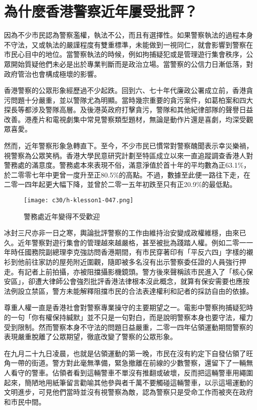 \section{為什麼香港警察近年屢受批評？}

因為不少市民認為警察濫權，執法不公，而且有選擇性。如果警察執法的過程本身不守法，又或執法的嚴謹程度有雙重標準，未能做到一視同仁，就會影響到警察在市民心目中的地位。當警察執法的時候，例如拘捕疑犯或是管理遊行集會秩序，公眾開始質疑他們未必是出於專業判斷而是政治立場。當警察的公信力日漸低落，對政府管治也會構成極壞的影響。

香港警察的公眾形象經歷過不少起跌。回到六、七十年代廉政公署成立前，香港貪污問題十分嚴重，並以警隊尤為明顯。當時幾宗重要的貪污案件，如葛柏案和四大探長等都涉及警隊高層。及後港英政府打擊貪污，警隊和其他紀律部隊的聲譽日益改善。港產片和電視劇集中常見警察類型題材，無論是動作片還是喜劇，均深受觀眾喜愛。

然而，近年警察形象急轉直下。至今，不少市民已慣常對警察醜聞表示幸災樂禍，視警察為公眾笑柄。香港大學民意研究計劃至特區成立以來一直追蹤調查香港人對警務處的滿意度。警務處本來表現不俗，滿意淨值於首十年的平均數為正63.1\%，於二零零七年中更曾一度升至正80.5\%的高點。不過，數據至此便一路往下走，在二零一四年起更大幅下降，並曾於二零一五年初跌至只有正20.9\%的最低點。

\begin{figure}[htbp]
    \centering
    \texttt{[image: c30/h-klesson1-047.png]}
    \caption{警務處近年變得不受歡迎} 
\end{figure}

冰封三尺亦非一日之寒，輿論批評警察的工作由維持治安變成政權維穩，由來已久。近年警察對遊行集會的管理越來越嚴格，甚至被批為踐踏人權。例如二零一一年時任國務院副總理李克強訪問香港期間，有市民穿著印有「平反六四」字樣的襯衫到他前往家訪的屋苑附近圍觀，隨即被多名沒有出示警察委任證的人員強行押走。有記者上前拍攝，亦被阻擋攝影機鏡頭。警方後來聲稱該市民進入了「核心保安區」，卻遭大律師公會強烈批評香港法律根本沒此概念，就算有保安需要也應按法例設立禁區，警方未能解釋阻擋市民的合法表達權利和記者的採訪自由的依據。

尊重人權一直是香港社會對警察專業操守的主要期望之一。電影中警察拘捕疑犯時的一句「你有權保持緘默」並不只是一句對白，而是說明警察本身也要守法，權力受到限制。然而警察本身不守法的問題日益嚴重，二零一四年佔領運動期間警察的表現嚴重脫離了公眾期望，徹底改變了警察的公眾形象。

在九月二十九日凌晨，也就是佔領運動的第一晚，市民在沒有約定下自發佔領了旺角一帶的街道。警方對此毫無準備，緊急撤離在前線的少數警察，還留下了一輛無人看守的警車。佔領者看到這輛警車不單沒有推翻或破壞，反而把這輛警車用繩圍起來，簡陋地用紙筆留言勸喻其他參與者千萬不要觸碰這輛警車，以示這場運動的文明進步，可見他們當時並沒有視警察為敵，認為警察只是受命工作而被夾在政府和市民中間。

